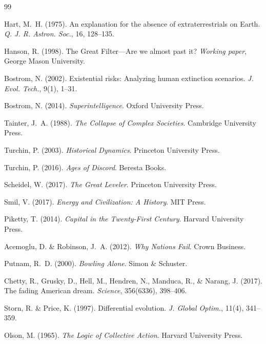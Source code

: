 \begin{thebibliography}{99}

Hart, M.~H. (1975). An explanation for the absence of extraterrestrials on Earth. \textit{Q. J. R. Astron. Soc.}, 16, 128--135.

Hanson, R. (1998). The Great Filter---Are we almost past it? \textit{Working paper}, George Mason University.

Bostrom, N. (2002). Existential risks: Analyzing human extinction scenarios. \textit{J. Evol. Tech.}, 9(1), 1--31.

Bostrom, N. (2014). \textit{Superintelligence}. Oxford University Press.

Tainter, J.~A. (1988). \textit{The Collapse of Complex Societies}. Cambridge University Press.

Turchin, P. (2003). \textit{Historical Dynamics}. Princeton University Press.

Turchin, P. (2016). \textit{Ages of Discord}. Beresta Books.

Scheidel, W. (2017). \textit{The Great Leveler}. Princeton University Press.

Smil, V. (2017). \textit{Energy and Civilization: A History}. MIT Press.

Piketty, T. (2014). \textit{Capital in the Twenty-First Century}. Harvard University Press.

Acemoglu, D. \& Robinson, J.~A. (2012). \textit{Why Nations Fail}. Crown Business.

Putnam, R.~D. (2000). \textit{Bowling Alone}. Simon \& Schuster.

Chetty, R., Grusky, D., Hell, M., Hendren, N., Manduca, R., \& Narang, J. (2017). The fading American dream. \textit{Science}, 356(6336), 398--406.

Storn, R. \& Price, K. (1997). Differential evolution. \textit{J. Global Optim.}, 11(4), 341--359.

Olson, M. (1965). \textit{The Logic of Collective Action}. Harvard University Press.


\end{thebibliography}

